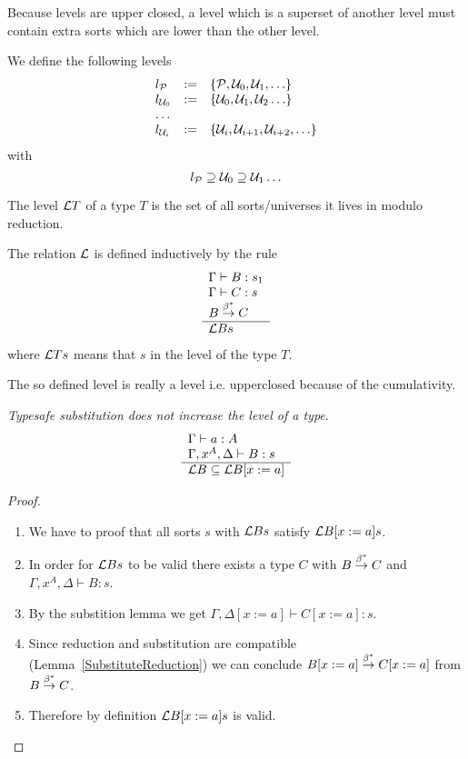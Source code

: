 Because levels are upper closed, a level which is a superset of another level
must contain extra sorts which are lower than the other level.

We define the following levels
$$
\begin{array}{lll}
    l_{\cal P} &:=& \{{\cal P}, {\cal U}_0, {\cal U}_1, \ldots\}
    \\
    l_{{\cal U}_0} &:=& \{ {\cal U}_0, {\cal U}_1, {\cal U}_2 \ldots \}
    \\
    \ldots
    \\
    l_{{\cal U}_i} &:=& \{ {\cal U}_i, {\cal U}_{i+1}, {\cal U}_{i+2}, \ldots \}
\end{array}
$$
with
$$
    l_{\cal P} \supseteq {\cal U}_0 \supseteq {\cal U}_1 \ldots
$$


\begin{definition}
    The level ${\cal L} T$ of a type $T$ is the set of all sorts/universes it
    lives in modulo reduction.

    The relation ${\cal L}$ is defined inductively by the rule
    $$
    \begin{array}{l} 
        \Gamma \vdash B: s_1
        \\
        \Gamma \vdash C: s
        \\
        B \stackrel{\beta^*}{\to} C
     \\ \hline {\cal L} B s\end{array}
    $$
    where ${\cal L} T s$ means that $s$ in the level of the type $T$.
\end{definition}

The so defined level is really a level i.e. upperclosed because of the
cumulativity.


\begin{theorem}
    \emph{Typesafe substitution does not increase the level of a type}.
    $$
    \begin{array}{l} 
        \Gamma \vdash a: A
        \\
        \Gamma, x^A, \Delta \vdash B: s
     \\ \hline {\cal L} B \subseteq {\cal L} B[x:=a]\end{array}
    $$


    \begin{proof}
    \begin{enumerate}
        \item We have to proof that all sorts $s$ with ${\cal L} B s$ satisfy
        ${\cal L} B[x:=a] s$.

        \item In order for ${\cal L} B s$ to be valid there exists a type $C$ with $B
        \stackrel{\beta^*}{\to} C$ and $\Gamma, x^A, \Delta \vdash B: s$.

        \item By the substition lemma we get $\Gamma, \Delta[x:=a] \vdash C[x:=a]: s$.

        \item Since reduction and substitution are compatible
            (Lemma~\ref{SubstituteReduction})
            we can conclude $B[x:=a]
        \stackrel{\beta^*}{\to} C[x:=a]$  from $B \stackrel{\beta^*}{\to} C$.

        \item Therefore by definition ${\cal L} B[x:=a] s$ is valid.
    \end{enumerate}
    \end{proof}
\end{theorem}




